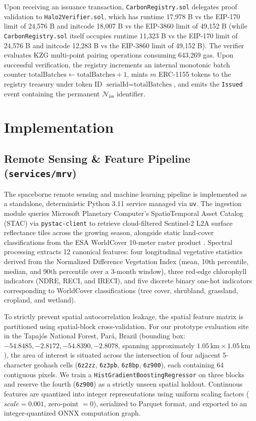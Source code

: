 \documentclass[preprint,12pt]{elsarticle}
\begin{document}
Upon receiving an issuance transaction, \texttt{CarbonRegistry.sol} delegates proof validation to \texttt{Halo2Verifier.sol}, which has runtime 17,978 B vs the EIP-170 limit of 24,576 B and initcode 18,007 B vs the EIP-3860 limit of 49,152 B (while \texttt{CarbonRegistry.sol} itself occupies runtime 11,323 B vs the EIP-170 limit of 24,576 B and initcode 12,283 B vs the EIP-3860 limit of 49,152 B). The verifier evaluates KZG multi-point pairing operations consuming 643,269 gas. Upon successful verification, the registry increments an internal monotonic batch counter $\text{totalBatches} \leftarrow \text{totalBatches} + 1$, mints $m$ ERC-1155 tokens to the registry treasury under token ID $\text{serialId} = \text{totalBatches}$, and emits the \texttt{Issued} event containing the permanent $\mathcal{N}_{\text{iss}}$ identifier.


\section{Implementation}

\subsection{Remote Sensing \& Feature Pipeline (\texttt{services/mrv})}

The spaceborne remote sensing and machine learning pipeline is implemented as a standalone, deterministic Python 3.11 service managed via \texttt{uv}. The ingestion module queries Microsoft Planetary Computer's SpatioTemporal Asset Catalog (STAC) via \texttt{pystac-client} to retrieve cloud-filtered Sentinel-2 L2A surface reflectance tiles across the growing season, alongside static land-cover classifications from the ESA WorldCover 10-meter raster product \cite{drusch2012sentinel,zanaga2021esa}. Spectral processing extracts 12 canonical features: four longitudinal vegetative statistics derived from the Normalized Difference Vegetation Index (mean, 10th percentile, median, and 90th percentile over a 3-month window), three red-edge chlorophyll indicators (NDRE, RECI, and IRECI), and five discrete binary one-hot indicators corresponding to WorldCover classifications (tree cover, shrubland, grassland, cropland, and wetland).

To strictly prevent spatial autocorrelation leakage, the spatial feature matrix is partitioned using spatial-block cross-validation. For our prototype evaluation site in the Tapajós National Forest, Pará, Brazil (bounding box: $-54.8485, -2.8172, -54.8390, -2.8078$, spanning approximately $1.05\,\text{km} \times 1.05\,\text{km}$), the area of interest is situated across the intersection of four adjacent 5-character geohash cells (\texttt{6z2zz}, \texttt{6z3pb}, \texttt{6z8bp}, \texttt{6z900}), each containing 64 contiguous pixels. We train a \texttt{HistGradientBoostingRegressor} on three blocks and reserve the fourth (\texttt{6z900}) as a strictly unseen spatial holdout. Continuous features are quantized into integer representations using uniform scaling factors ($scale = 0.001$, zero-point $= 0$), serialized to Parquet format, and exported to an integer-quantized ONNX computation graph.
\end{document}
